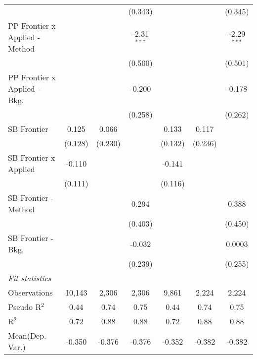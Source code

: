\begin{tabular}{lcccccc}
                                  &                &              & (0.343)       &                &              & (0.345)\\   
   PP Frontier x Applied - Method &                &              & -2.31$^{***}$ &                &              & -2.29$^{***}$\\   
                                  &                &              & (0.500)       &                &              & (0.501)\\   
   PP Frontier x Applied - Bkg.   &                &              & -0.200        &                &              & -0.178\\   
                                  &                &              & (0.258)       &                &              & (0.262)\\   
   SB Frontier                    & 0.125          & 0.066        &               & 0.133          & 0.117        &   \\   
                                  & (0.128)        & (0.230)      &               & (0.132)        & (0.236)      &   \\   
   SB Frontier x Applied          & -0.110         &              &               & -0.141         &              &   \\   
                                  & (0.111)        &              &               & (0.116)        &              &   \\   
   SB Frontier - Method           &                &              & 0.294         &                &              & 0.388\\   
                                  &                &              & (0.403)       &                &              & (0.450)\\   
   SB Frontier - Bkg.             &                &              & -0.032        &                &              & 0.0003\\   
                                  &                &              & (0.239)       &                &              & (0.255)\\   
   \midrule
   \emph{Fit statistics}\\
   Observations                   & 10,143         & 2,306        & 2,306         & 9,861          & 2,224        & 2,224\\  
   Pseudo R$^2$                   & 0.44           & 0.74         & 0.75          & 0.44           & 0.74         & 0.75\\  
   R$^2$                          & 0.72           & 0.88         & 0.88          & 0.72           & 0.88         & 0.88\\  
Mean(Dep. Var.) & -0.350 & -0.376 & -0.376 & -0.352 & -0.382 & -0.382 \\
   

\end{tabular}

